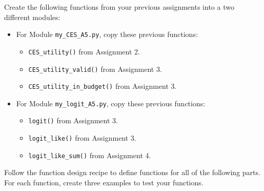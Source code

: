 \documentclass[11pt]{exam}
\begin{document}
    \begin{questions}

\question Create the following functions from your previous assignments into a two different modules:

\begin{itemize}
    \item For Module \texttt{my\_CES\_A5.py}, copy these previous functions:

    \begin{itemize}
      \item \texttt{CES\_utility()} from Assignment 2.
      \item \texttt{CES\_utility\_valid()} from Assignment 3.
      \item \texttt{CES\_utility\_in\_budget()} from Assignment 3.
    \end{itemize} 

    \item For Module \texttt{my\_logit\_A5.py}, copy these previous functions:

    \begin{itemize}
      \item \texttt{logit()} from Assignment 3.
      \item \texttt{logit\_like()} from Assignment 3.
      \item \texttt{logit\_like\_sum()} from Assignment 4.
    \end{itemize}  
\end{itemize}

\question Follow the function design recipe to define functions for all of the following parts. For each
function, create three examples to test your functions.

\end{questions}
\end{document}
